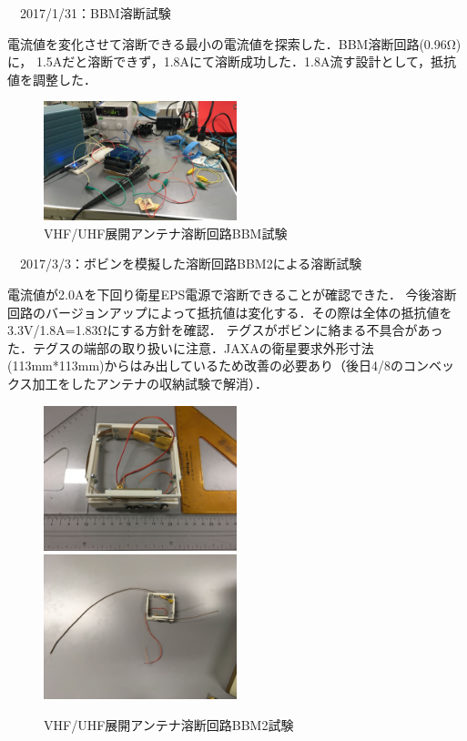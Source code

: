 \noindent　2017/1/31：BBM溶断試験

電流値を変化させて溶断できる最小の電流値を探索した．BBM溶断回路(0.96Ω)に，
1.5Aだと溶断できず，1.8Aにて溶断成功した．1.8A流す設計として，抵抗値を調整した．
\begin{figure}[H]
	\centering
	\includegraphics[width=0.5\textwidth]{03/fig/3-8-6.jpg}
	\caption{VHF/UHF展開アンテナ溶断回路BBM試験}
	\label{fig3-8-6}
\end{figure}

\noindent　2017/3/3：ボビンを模擬した溶断回路BBM2による溶断試験

電流値が2.0Aを下回り衛星EPS電源で溶断できることが確認できた．
今後溶断回路のバージョンアップによって抵抗値は変化する．その際は全体の抵抗値を3.3V/1.8A=1.83Ωにする方針を確認．
テグスがボビンに絡まる不具合があった．テグスの端部の取り扱いに注意．JAXAの衛星要求外形寸法(113mm*113mm)からはみ出しているため改善の必要あり（後日4/8のコンベックス加工をしたアンテナの収納試験で解消）．

\begin{figure}[H]
	\centering
	\includegraphics[width=0.5\textwidth]{03/fig/3-8-7.jpg}
	\includegraphics[width=0.5\textwidth]{03/fig/3-8-8.jpg}
	\caption{VHF/UHF展開アンテナ溶断回路BBM2試験}
	\label{fig3-8-8}
\end{figure}

